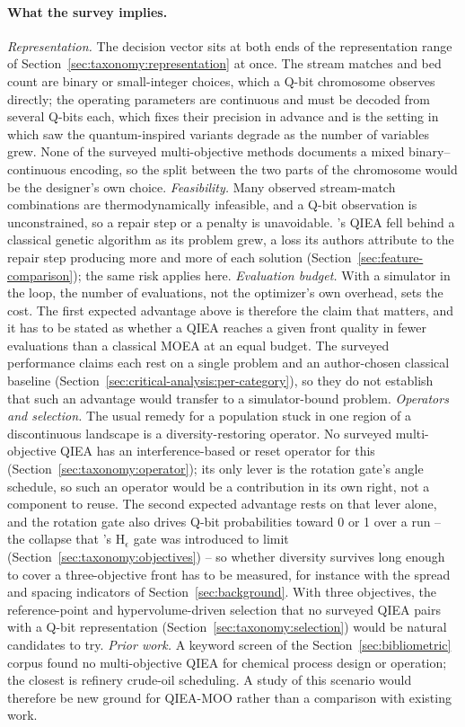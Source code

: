 \paragraph{What the survey implies.}
\emph{Representation.} The decision vector sits at both ends of the
representation range of Section~\ref{sec:taxonomy:representation} at
once. The stream matches and bed count are binary or small-integer
choices, which a Q-bit chromosome observes directly; the operating
parameters are continuous and must be decoded from several Q-bits each,
which fixes their precision in advance and is the setting in which
\citet{olvera2023continuous} saw the quantum-inspired variants degrade
as the number of variables grew. None of the surveyed multi-objective
methods documents a mixed binary--continuous encoding, so the split
between the two parts of the chromosome would be the designer's own
choice. \emph{Feasibility.} Many observed stream-match combinations are
thermodynamically infeasible, and a Q-bit observation is unconstrained,
so a repair step or a penalty is unavoidable. \citet{gilea2026waste}'s
QIEA fell behind a classical genetic algorithm as its problem grew, a
loss its authors attribute to the repair step producing more and more
of each solution (Section~\ref{sec:feature-comparison}); the same risk
applies here.
\emph{Evaluation budget.} With a simulator in the loop, the number of
evaluations, not the optimizer's own overhead, sets the cost. The first
expected advantage above is therefore the claim that matters, and it
has to be stated as whether a QIEA reaches a given front quality
in fewer evaluations than a classical MOEA at an equal budget. The
surveyed performance claims each rest on a single problem and an
author-chosen classical baseline
(Section~\ref{sec:critical-analysis:per-category}), so they do not
establish that such an advantage would transfer to a simulator-bound
problem. \emph{Operators and selection.} The usual remedy for a
population stuck in one region of a discontinuous landscape is a
diversity-restoring operator. No surveyed multi-objective QIEA has an
interference-based or reset operator for this
(Section~\ref{sec:taxonomy:operator}); its only lever is the rotation
gate's angle schedule, so such an operator would be a contribution in
its own right, not a component to reuse. The second expected advantage
rests on that lever alone, and the rotation gate also drives Q-bit
probabilities toward 0 or 1 over a run -- the collapse that
\citet{han2004hepsilon}'s H$_\epsilon$ gate was introduced to limit
(Section~\ref{sec:taxonomy:objectives}) -- so whether diversity
survives long enough to cover a three-objective front has to be
measured, for instance with the spread and spacing indicators of
Section~\ref{sec:background}. With three objectives, the
reference-point and hypervolume-driven selection that no surveyed QIEA
pairs with a Q-bit representation (Section~\ref{sec:taxonomy:selection})
would be natural candidates to try. \emph{Prior work.} A keyword
screen of the Section~\ref{sec:bibliometric} corpus found no
multi-objective QIEA for chemical process design or operation; the
closest is refinery crude-oil scheduling. A study of this scenario
would therefore be new ground for QIEA-MOO rather than a comparison
with existing work.

